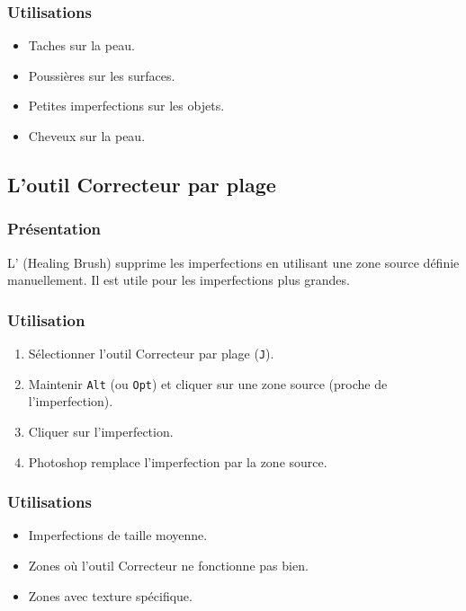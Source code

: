 \subsubsection{Utilisations}

\begin{itemize}
    \item Taches sur la peau.
    \item Poussières sur les surfaces.
    \item Petites imperfections sur les objets.
    \item Cheveux sur la peau.
\end{itemize}

\subsection{L'outil Correcteur par plage}

\subsubsection{Présentation}

L' (Healing Brush) supprime les imperfections en utilisant une zone source définie manuellement. Il est utile pour les imperfections plus grandes.

\subsubsection{Utilisation}

\begin{enumerate}
    \item Sélectionner l'outil Correcteur par plage (\texttt{J}).
    \item Maintenir \texttt{Alt} (ou \texttt{Opt}) et cliquer sur une zone source (proche de l'imperfection).
    \item Cliquer sur l'imperfection.
    \item Photoshop remplace l'imperfection par la zone source.
\end{enumerate}

\subsubsection{Utilisations}

\begin{itemize}
    \item Imperfections de taille moyenne.
    \item Zones où l'outil Correcteur ne fonctionne pas bien.
    \item Zones avec texture spécifique.
\end{itemize}

